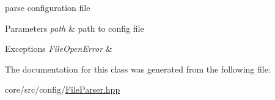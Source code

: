 parse configuration file 


\begin{DoxyParams}{Parameters}
{\em path} & path to config file \\
\hline
\end{DoxyParams}

\begin{DoxyExceptions}{Exceptions}
{\em FileOpenError} & \\
\hline
\end{DoxyExceptions}


The documentation for this class was generated from the following file:\begin{DoxyCompactItemize}
\item 
core/src/config/\hyperlink{FileParser_8hpp}{FileParser.hpp}\end{DoxyCompactItemize}
